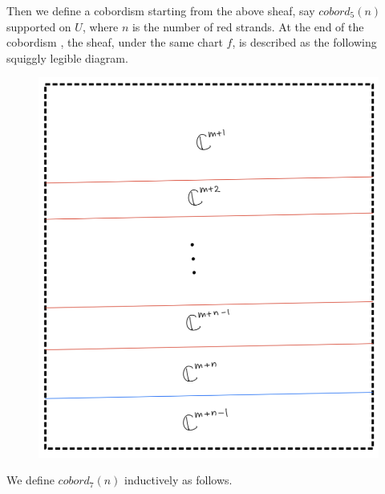 Then we define a cobordism starting from the above sheaf, say $cobord_5(n)$ supported on $U$, where $n$ is the number of red strands. At the end of the cobordism , the sheaf, under the same chart $f$, is described as the following squiggly legible diagram.
\begin{figure}[H]
    \centering
    \includegraphics[scale = 0.95]{diagrams/cobord7/7.png}
    \caption{}
    \label{fig:your-label}
\end{figure}
\pagebreak 
We define $cobord_7(n)$ inductively as follows.
